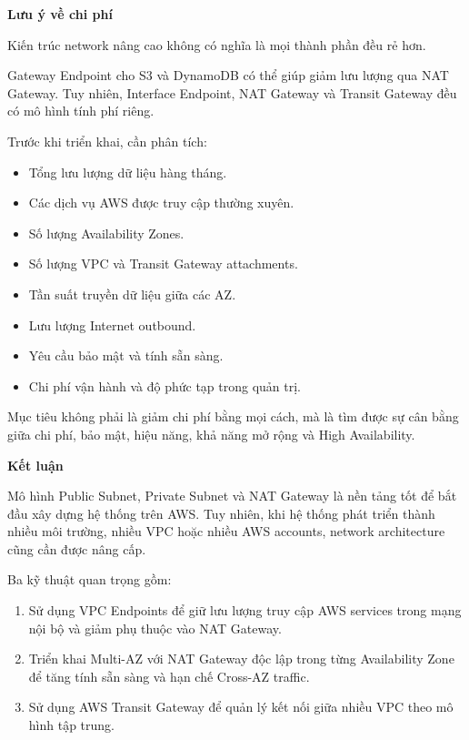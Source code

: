 \vspace{0.5em}\noindent\textbf{Lưu ý về chi phí}\par

Kiến trúc network nâng cao không có nghĩa là mọi thành phần đều rẻ hơn.

Gateway Endpoint cho S3 và DynamoDB có thể giúp giảm lưu lượng qua NAT
Gateway. Tuy nhiên, Interface Endpoint, NAT Gateway và Transit Gateway
đều có mô hình tính phí riêng.

Trước khi triển khai, cần phân tích:

\begin{itemize}
\tightlist
\item
  Tổng lưu lượng dữ liệu hàng tháng.
\item
  Các dịch vụ AWS được truy cập thường xuyên.
\item
  Số lượng Availability Zones.
\item
  Số lượng VPC và Transit Gateway attachments.
\item
  Tần suất truyền dữ liệu giữa các AZ.
\item
  Lưu lượng Internet outbound.
\item
  Yêu cầu bảo mật và tính sẵn sàng.
\item
  Chi phí vận hành và độ phức tạp trong quản trị.
\end{itemize}

Mục tiêu không phải là giảm chi phí bằng mọi cách, mà là tìm được sự cân
bằng giữa chi phí, bảo mật, hiệu năng, khả năng mở rộng và High
Availability.

\vspace{0.5em}\noindent\textbf{Kết luận}\par

Mô hình Public Subnet, Private Subnet và NAT Gateway là nền tảng tốt để
bắt đầu xây dựng hệ thống trên AWS. Tuy nhiên, khi hệ thống phát triển
thành nhiều môi trường, nhiều VPC hoặc nhiều AWS accounts, network
architecture cũng cần được nâng cấp.

Ba kỹ thuật quan trọng gồm:

\begin{enumerate}
\def\labelenumi{\arabic{enumi}.}
\tightlist
\item
  Sử dụng VPC Endpoints để giữ lưu lượng truy cập AWS services trong
  mạng nội bộ và giảm phụ thuộc vào NAT Gateway.
\item
  Triển khai Multi-AZ với NAT Gateway độc lập trong từng Availability
  Zone để tăng tính sẵn sàng và hạn chế Cross-AZ traffic.
\item
  Sử dụng AWS Transit Gateway để quản lý kết nối giữa nhiều VPC theo mô
  hình tập trung.
\end{enumerate}

